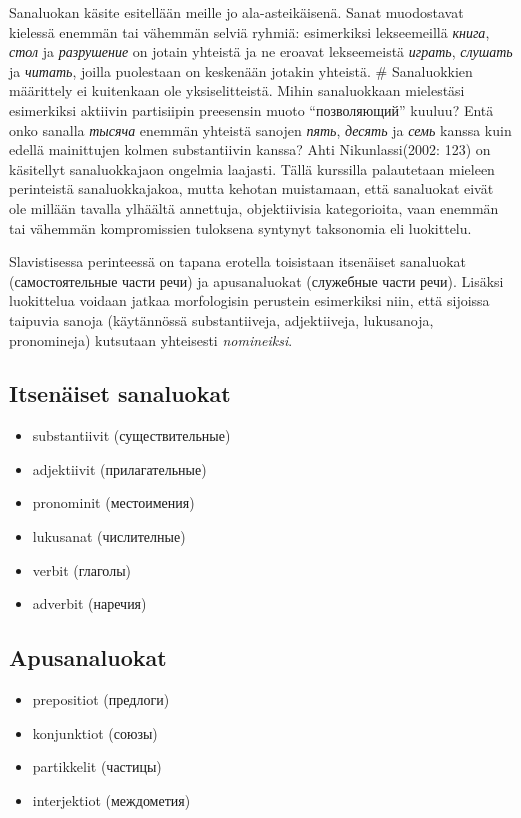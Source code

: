 \documentclass[]{scrreprt}
\providecommand{\tightlist}{%
  \setlength{\itemsep}{0pt}\setlength{\parskip}{0pt}}
\begin{document}
Sanaluokan käsite esitellään meille jo ala-asteikäisenä. Sanat
muodostavat kielessä enemmän tai vähemmän selviä ryhmiä: esimerkiksi
lekseemeillä \emph{книга}, \emph{стол} ja \emph{разрушение} on jotain
yhteistä ja ne eroavat lekseemeistä \emph{играть}, \emph{слушать} ja
\emph{читать}, joilla puolestaan on keskenään jotakin yhteistä. \#
Sanaluokkien määrittely ei kuitenkaan ole yksiselitteistä. Mihin
sanaluokkaan mielestäsi esimerkiksi aktiivin partisiipin preesensin
muoto ``позволяющий'' kuuluu? Entä onko sanalla \emph{тысяча} enemmän
yhteistä sanojen \emph{пять}, \emph{десять} ja \emph{семь} kanssa kuin
edellä mainittujen kolmen substantiivin kanssa? Ahti Nikunlassi(2002:
123) on käsitellyt sanaluokkajaon ongelmia laajasti. Tällä kurssilla
palautetaan mieleen perinteistä sanaluokkajakoa, mutta kehotan
muistamaan, että sanaluokat eivät ole millään tavalla ylhäältä
annettuja, objektiivisia kategorioita, vaan enemmän tai vähemmän
kompromissien tuloksena syntynyt taksonomia eli luokittelu.

Slavistisessa perinteessä on tapana erotella toisistaan itsenäiset
sanaluokat (самостоятельные части речи) ja apusanaluokat (служебные
части речи). Lisäksi luokittelua voidaan jatkaa morfologisin perustein
esimerkiksi niin, että sijoissa taipuvia sanoja (käytännössä
substantiiveja, adjektiiveja, lukusanoja, pronomineja) kutsutaan
yhteisesti \emph{nomineiksi}.

\subsection{Itsenäiset sanaluokat}\label{itsenuxe4iset-sanaluokat}

\begin{itemize}
\tightlist
\item
  substantiivit (существительные)
\item
  adjektiivit (прилагательные)
\item
  pronominit (местоимения)
\item
  lukusanat (числителные)
\item
  verbit (глаголы)
\item
  adverbit (наречия)
\end{itemize}

\subsection{Apusanaluokat}\label{apusanaluokat}

\begin{itemize}
\tightlist
\item
  prepositiot (предлоги)
\item
  konjunktiot (союзы)
\item
  partikkelit (частицы)
\item
  interjektiot (междометия)
\end{itemize}
\end{document}
